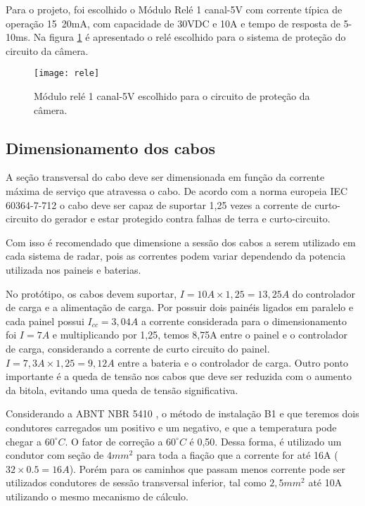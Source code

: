 Para o projeto, foi escolhido o Módulo Relé 1 canal-5V com corrente típica de operação 15~20mA, com capacidade de 30VDC e 10A e tempo de resposta de 5-10ms. Na figura \ref{fig:rele} é apresentado o relé escolhido para o sistema de proteção do circuito da câmera.

\begin{figure}[H]
\centering
\texttt{[image: rele]}
    \caption{Módulo relé 1 canal-5V escolhido para o circuito de proteção da câmera.}
\label{fig:rele}
\end{figure}
\FloatBarrier

\subsection{Dimensionamento dos cabos}

A seção transversal do cabo deve ser dimensionada em função da corrente máxima de serviço que atravessa o cabo. De acordo com a norma europeia IEC 60364-7-712 \cite{instalacao} o cabo deve ser capaz de suportar 1,25 vezes a corrente de curto-circuito do gerador e estar protegido contra falhas de terra e curto-circuito. 

Com isso é recomendado que dimensione a sessão dos cabos a serem utilizado em cada sistema de radar, pois as correntes podem variar dependendo da potencia utilizada nos paineis e baterias. 

No protótipo, os cabos devem suportar, $I = 10A \times 1,25 = 13,25A$ do controlador de carga e a alimentação de carga. Por possuir dois painéis ligados em paralelo e cada painel possui $I_{cc} = 3,04 A$ a corrente considerada para o dimensionamento foi $I = 7A$ e multiplicando por 1,25, temos 8,75A entre o painel e o  controlador de carga, considerando a corrente de curto circuito do painel. $I = 7,3A \times 1,25 = 9,12 A$ entre a bateria e o controlador de carga. Outro ponto importante é a queda de tensão nos cabos que deve ser reduzida com o aumento da bitola, evitando uma queda de tensão significativa.

Considerando a ABNT NBR 5410 \cite{protecao}, o método de instalação B1 e que teremos dois condutores carregados um positivo e um negativo, e que a temperatura pode chegar a $60^{\circ}C$. O fator de correção a $60^{\circ}C$ é 0,50.  Dessa forma, é utilizado um condutor com seção de $4mm^2$ para toda a fiação que a corrente for até 16A ($32 \times 0.5 = 16A$). Porém para os caminhos que passam menos corrente pode ser utilizados condutores de sessão transversal inferior, tal como $2,5mm^2$ até 10A utilizando o mesmo mecanismo de cálculo.

